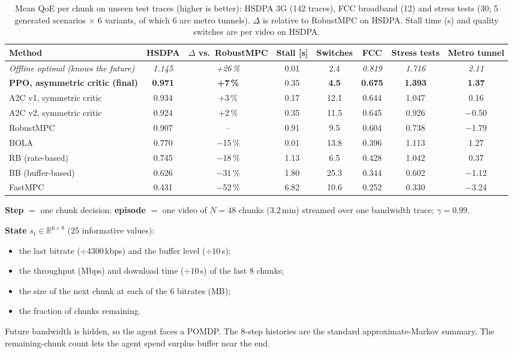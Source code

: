 \documentclass[10pt,twocolumn]{article}
\makeatletter
\renewcommand\section{\@startsection{section}{1}{\z@}{-1.0ex plus -.5ex}{0.4ex}{\normalfont\normalsize\bfseries}}
\makeatother
\begin{document}
\begin{table}[t]
\centering\footnotesize
\caption{Mean QoE per chunk on unseen test traces (higher is better): HSDPA 3G (142 traces), FCC broadband
(12) and stress tests (30; 5 generated scenarios $\times$ 6 variants, of which 6 are metro tunnels).
$\Delta$ is relative to RobustMPC on HSDPA. Stall time (s) and quality switches are per video on HSDPA.}
\label{tab:results}
\setlength{\tabcolsep}{5pt}
\begin{tabular}{lccccccc}
\toprule
Method & HSDPA & $\Delta$ vs.\ RobustMPC & Stall [s] & Switches & FCC & Stress tests & Metro tunnel\\
\midrule
\textit{Offline optimal (knows the future)} & \textit{1.145} & \textit{+26\,\%} & 0.01 & 2.4 & \textit{0.819} & \textit{1.716} & \textit{2.11}\\
\midrule
\textbf{PPO, asymmetric critic (final)} & \textbf{0.971} & \textbf{+7\,\%} & 0.35 & \textbf{4.5} & \textbf{0.675} & \textbf{1.393} & \textbf{1.37}\\
A2C v1, symmetric critic & 0.934 & +3\,\% & 0.17 & 12.1 & 0.644 & 1.047 & 0.16\\
A2C v2, symmetric critic & 0.924 & +2\,\% & 0.35 & 11.5 & 0.645 & 0.926 & $-$0.50\\
\midrule
RobustMPC & 0.907 & -- & 0.91 & 9.5 & 0.604 & 0.738 & $-$1.79\\
BOLA & 0.770 & $-$15\,\% & 0.01 & 13.8 & 0.396 & 1.113 & 1.27\\
RB (rate-based) & 0.745 & $-$18\,\% & 1.13 & 6.5 & 0.428 & 1.042 & 0.37\\
BB (buffer-based) & 0.626 & $-$31\,\% & 1.80 & 25.3 & 0.344 & 0.602 & $-$1.12\\
FastMPC & 0.431 & $-$52\,\% & 6.82 & 10.6 & 0.252 & 0.330 & $-$3.24\\
\bottomrule
\end{tabular}
\end{table}

\section{RL Formulation}
\textbf{Step} $=$ one chunk decision; \textbf{episode} $=$ one video of $N{=}48$ chunks (3.2\,min)
streamed over one bandwidth trace; $\gamma=0.99$.

\textbf{State} $s_t\in\mathbb{R}^{6\times 8}$ (25 informative values):
\begin{itemize}
  \item the last bitrate ($\div4300$\,kbps) and the buffer level ($\div10$\,s);
  \item the throughput (Mbps) and download time ($\div10$\,s) of the last 8 chunks;
  \item the size of the next chunk at each of the 6 bitrates (MB);
  \item the fraction of chunks remaining.
\end{itemize}
Future bandwidth is hidden, so the agent faces a POMDP. The 8-step histories are the standard
approximate-Markov summary. The remaining-chunk count lets the agent spend surplus buffer near the end.
\end{document}
